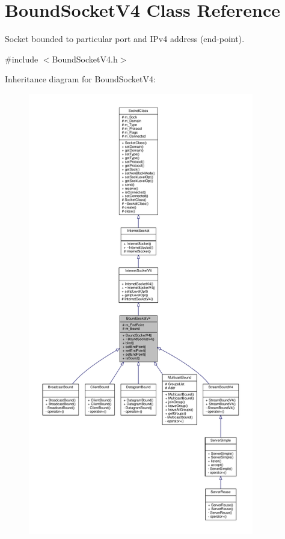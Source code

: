\hypertarget{classBoundSocketV4}{}\section{Bound\+Socket\+V4 Class Reference}
\label{classBoundSocketV4}


Socket bounded to particular port and I\+Pv4 address (end-\/point).  




{\ttfamily \#include $<$Bound\+Socket\+V4.\+h$>$}



Inheritance diagram for Bound\+Socket\+V4\+:\nopagebreak
\begin{figure}[H]
\begin{center}
\leavevmode
\includegraphics[height=550pt]{classBoundSocketV4__inherit__graph}
\end{center}
\end{figure}
